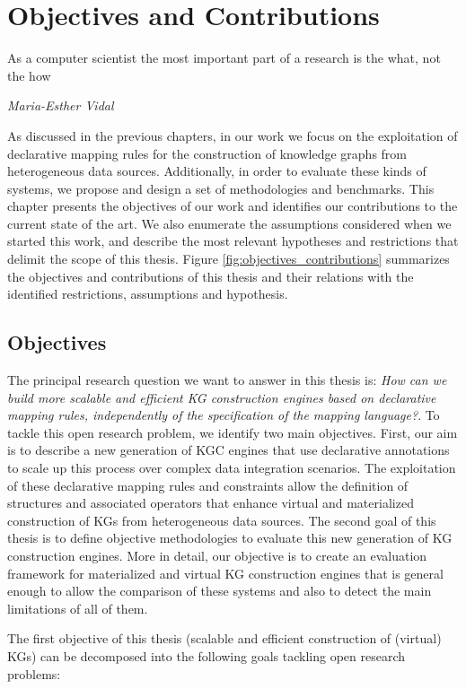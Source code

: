 \chapter{Objectives and Contributions}

\epigraph{As a computer scientist the most important part of a research is the what, not the how}{\textit{Maria-Esther Vidal}}

\label{chap:objectives}
As discussed in the previous chapters, in our work we focus on the exploitation of declarative mapping rules for the construction of knowledge graphs from heterogeneous data sources. Additionally, in order to evaluate these kinds of systems, we propose and design a set of methodologies and benchmarks. This chapter presents the objectives of our work and identifies our contributions to the current state of the art. We also enumerate the assumptions considered when we started this work, and describe the most relevant hypotheses and restrictions that delimit the scope of this thesis. Figure \ref{fig:objectives_contributions} summarizes the objectives and contributions of this thesis and their relations with the identified restrictions, assumptions and hypothesis.

\section{Objectives}
The principal research question we want to answer in this thesis is: \textit{How can we build more scalable and efficient KG construction engines based on declarative mapping rules, independently of the specification of the mapping language?}. To tackle this open research problem, we identify two main objectives. 
First, our aim is to describe a new generation of KGC engines that use declarative annotations to scale up this process over complex data integration scenarios. The exploitation of these declarative mapping rules and constraints allow the definition of structures and associated operators that enhance virtual and materialized construction of KGs from heterogeneous data sources. The second goal of this thesis is to define objective methodologies to evaluate this new generation of KG construction engines. More in detail, our objective is to create an evaluation framework for materialized and virtual KG construction engines that is general enough to allow the comparison of these systems and also to detect the main limitations of all of them.

The first objective of this thesis (scalable and efficient construction of (virtual) KGs) can be decomposed into the following goals tackling open research problems:

